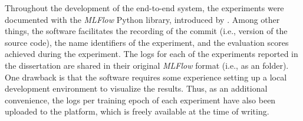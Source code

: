 
Throughout the development of the end-to-end system, the
experiments were documented with the \emph{MLFlow} Python
library, introduced by \textcite{zaharia2018accelerating}.
Among other things, the software facilitates the recording
of the  commit (i.e., version of the source code),
the name identifiers of the experiment, and the evaluation
scores achieved during the experiment. The logs for each of
the experiments reported in the dissertation are shared in
their original \emph{MLFlow} format (i.e., as an
 folder). One drawback is that the software
requires some experience setting up a local development
environment to visualize the results. Thus, as an additional
convenience, the logs per training epoch of each experiment
have also been uploaded to the
platform, which is
freely available at the time of writing.
